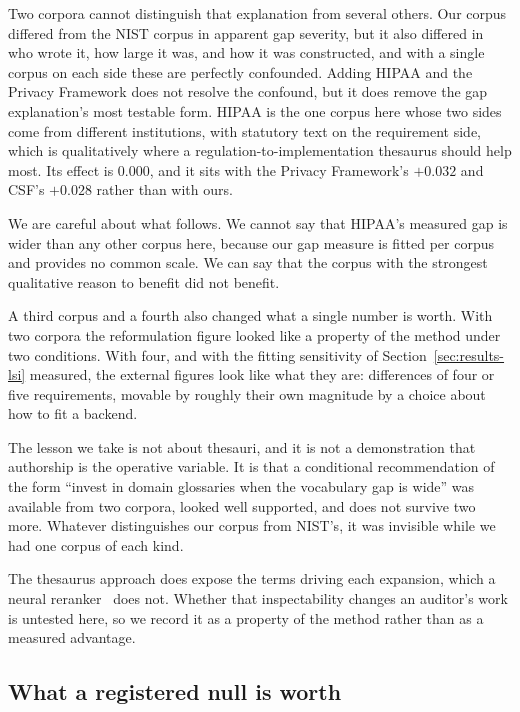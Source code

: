 \documentclass[smallextended,natbib]{svjour3}
\begin{document}
Two corpora cannot distinguish that explanation from several others. Our corpus differed from the NIST corpus in apparent gap severity, but it also differed in who wrote it, how large it was, and how it was constructed, and with a single corpus on each side these are perfectly confounded. Adding HIPAA and the Privacy Framework does not resolve the confound, but it does remove the gap explanation's most testable form. HIPAA is the one corpus here whose two sides come from different institutions, with statutory text on the requirement side, which is qualitatively where a regulation-to-implementation thesaurus should help most. Its effect is $0.000$, and it sits with the Privacy Framework's $+0.032$ and CSF's $+0.028$ rather than with ours.

We are careful about what follows. We cannot say that HIPAA's measured gap is wider than any other corpus here, because our gap measure is fitted per corpus and provides no common scale. We can say that the corpus with the strongest qualitative reason to benefit did not benefit.

A third corpus and a fourth also changed what a single number is worth. With two corpora the reformulation figure looked like a property of the method under two conditions. With four, and with the fitting sensitivity of Section~\ref{sec:results-lsi} measured, the external figures look like what they are: differences of four or five requirements, movable by roughly their own magnitude by a choice about how to fit a backend.

The lesson we take is not about thesauri, and it is not a demonstration that authorship is the operative variable. It is that a conditional recommendation of the form ``invest in domain glossaries when the vocabulary gap is wide'' was available from two corpora, looked well supported, and does not survive two more. Whatever distinguishes our corpus from NIST's, it was invisible while we had one corpus of each kind.

The thesaurus approach does expose the terms driving each expansion, which a neural reranker~\citep{Nogueira2019} does not.
Whether that inspectability changes an auditor's work is untested here, so we record it as a property of the method rather than as a measured advantage.

\subsection{What a registered null is worth}
\end{document}
